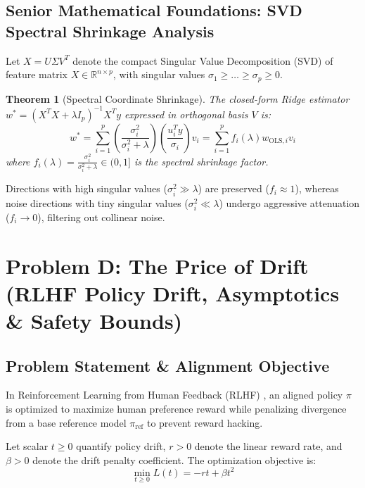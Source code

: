 \documentclass[11pt,a4paper]{article}
\theoremstyle{definition}
\theoremstyle{plain}
\newtheorem{theorem}{Theorem}[section]
\theoremstyle{remark}
\newcommand{\R}{\mathbb{R}}
\begin{document}
\subsection{Senior Mathematical Foundations: SVD Spectral Shrinkage Analysis}
Let $X = U \Sigma V^T$ denote the compact Singular Value Decomposition (SVD) of feature matrix $X \in \R^{n \times p}$, with singular values $\sigma_1 \ge \dots \ge \sigma_p \ge 0$.
\begin{theorem}[Spectral Coordinate Shrinkage]
The closed-form Ridge estimator $w^* = (X^T X + \lambda I_p)^{-1} X^T y$ expressed in orthogonal basis $V$ is:
\begin{equation}
w^* = \sum_{i=1}^p \left( \frac{\sigma_i^2}{\sigma_i^2 + \lambda} \right) \left( \frac{u_i^T y}{\sigma_i} \right) v_i = \sum_{i=1}^p f_i(\lambda) w_{\text{OLS}, i} v_i
\label{eq:spectral_shrinkage}
\end{equation}
where $f_i(\lambda) = \frac{\sigma_i^2}{\sigma_i^2 + \lambda} \in (0, 1]$ is the spectral shrinkage factor.
\end{theorem}
Directions with high singular values ($\sigma_i^2 \gg \lambda$) are preserved ($f_i \approx 1$), whereas noise directions with tiny singular values ($\sigma_i^2 \ll \lambda$) undergo aggressive attenuation ($f_i \to 0$), filtering out collinear noise.

\section{Problem D: The Price of Drift (RLHF Policy Drift, Asymptotics \& Safety Bounds)}

\subsection{Problem Statement \& Alignment Objective}
In Reinforcement Learning from Human Feedback (RLHF) \cite{ouyang2022training}, an aligned policy $\pi$ is optimized to maximize human preference reward while penalizing divergence from a base reference model $\pi_{\text{ref}}$ to prevent reward hacking.

Let scalar $t \ge 0$ quantify policy drift, $r > 0$ denote the linear reward rate, and $\beta > 0$ denote the drift penalty coefficient. The optimization objective is:
\begin{equation}
\min_{t \ge 0} L(t) = -rt + \beta t^2
\label{eq:scalar_drift_loss}
\end{equation}
\end{document}
